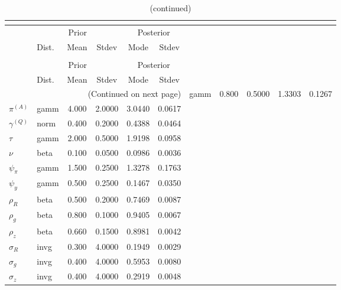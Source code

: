  
\begin{center}
\begin{longtable}{llcccc} 
\caption{Results from posterior maximization (parameters)}\\
 \label{Table:Posterior:1}\\
\toprule 
  & \multicolumn{3}{c}{Prior}  &  \multicolumn{2}{c}{Posterior} \\
  \cmidrule(r{.75em}){2-4} \cmidrule(r{.75em}){5-6}
  & Dist. & Mean  & Stdev & Mode & Stdev \\ 
\midrule \endfirsthead 
\caption{(continued)}\\
 \bottomrule 
  & \multicolumn{3}{c}{Prior}  &  \multicolumn{2}{c}{Posterior} \\
  \cmidrule(r{.75em}){2-4} \cmidrule(r{.75em}){5-6}
  & Dist. & Mean  & Stdev & Mode & Stdev \\ 
\midrule \endhead 
\bottomrule \multicolumn{6}{r}{(Continued on next page)}\endfoot 
\bottomrule\endlastfoot 
${r_{A}}$ & gamm &   0.800 & 0.5000 &   1.3303 &  0.1267 \\ 
${\pi^{(A)}}$ & gamm &   4.000 & 2.0000 &   3.0440 &  0.0617 \\ 
${\gamma^{(Q)}}$ & norm &   0.400 & 0.2000 &   0.4388 &  0.0464 \\ 
${\tau}$ & gamm &   2.000 & 0.5000 &   1.9198 &  0.0958 \\ 
${\nu}$ & beta &   0.100 & 0.0500 &   0.0986 &  0.0036 \\ 
${\psi_\pi}$ & gamm &   1.500 & 0.2500 &   1.3278 &  0.1763 \\ 
${\psi_y}$ & gamm &   0.500 & 0.2500 &   0.1467 &  0.0350 \\ 
${\rho_R}$ & beta &   0.500 & 0.2000 &   0.7469 &  0.0087 \\ 
${\rho_{g}}$ & beta &   0.800 & 0.1000 &   0.9405 &  0.0067 \\ 
${\rho_z}$ & beta &   0.660 & 0.1500 &   0.8981 &  0.0042 \\ 
${\sigma_R}$ & invg &   0.300 & 4.0000 &   0.1949 &  0.0029 \\ 
${\sigma_{g}}$ & invg &   0.400 & 4.0000 &   0.5953 &  0.0080 \\ 
${\sigma_z}$ & invg &   0.400 & 4.0000 &   0.2919 &  0.0048 \\ 
\end{longtable}
 \end{center}
